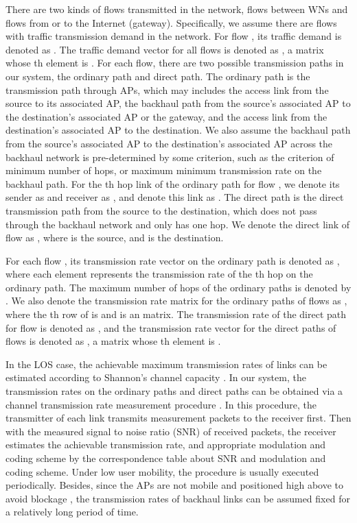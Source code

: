 \documentclass[journal]{IEEEtran}
\begin{document}
There are two kinds of flows transmitted in the network, flows between WNs
and flows from or to the Internet (gateway). Specifically, we assume there are  flows with
traffic transmission demand in the network. For flow , its traffic demand is denoted as .
The traffic demand vector for all flows is denoted as , a  matrix whose
th element is . For each flow, there are two possible transmission paths in our system, the
ordinary path and direct path. The ordinary path is the transmission path through APs, which may
includes the access link from the source to its associated AP, the backhaul path from the source's
associated AP to the destination's associated AP or the gateway, and the access link from the
destination's associated AP to the destination. We also assume the backhaul path from the source's
associated AP to the destination's associated AP across the backhaul network is pre-determined by
some criterion, such as the criterion of minimum number of hops, or maximum minimum transmission
rate on the backhaul path. For the th hop link of the ordinary path for flow , we denote its
sender as  and receiver as , and denote this link as . The direct
path is the direct transmission path from the source to the destination, which does not pass
through the backhaul network and only has one hop. We denote the direct link of flow  as
, where  is the source, and  is the destination.




For each flow , its transmission rate vector on the ordinary path
is denoted as , where each element  represents the transmission rate of the
th hop on the ordinary path. The maximum number of hops of the ordinary paths is denoted by
. We also denote the transmission rate matrix for the ordinary paths of flows as
, where the th row of  is  and  is an
 matrix. The transmission rate of the direct path for flow  is denoted as
, and the transmission rate vector for the direct paths of flows is denoted as
, a  matrix whose th element is .





In the LOS case, the achievable maximum
transmission rates of links can be estimated according to Shannon's channel capacity \cite{Qiao}.
In our system, the transmission rates on the ordinary paths and direct paths can be obtained via a
channel transmission rate measurement procedure \cite{tvt_own}. In this procedure, the transmitter
of each link transmits measurement packets to the receiver first. Then with the measured signal to
noise ratio (SNR) of received packets, the receiver estimates the achievable transmission rate, and
appropriate modulation and coding scheme by the correspondence table about SNR and modulation and
coding scheme. Under low user mobility, the procedure is usually executed periodically. Besides,
since the APs are not mobile and positioned high above to avoid blockage \cite{Pico_60GHz}, the
transmission rates of backhaul links can be assumed fixed for a relatively long period of time.
\end{document}
